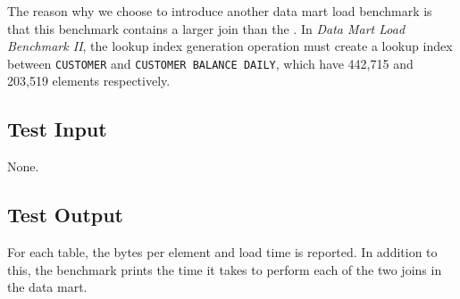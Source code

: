 The reason why we choose to introduce another data mart load benchmark is that this benchmark contains a larger join than the \tpchdl. In \textit{Data Mart Load Benchmark II}, the lookup index generation operation must create a lookup index between \texttt{CUSTOMER} and \texttt{CUSTOMER BALANCE DAILY}, which have 442,715 and 203,519 elements respectively.

\subsection{Test Input}
\label{sub:Test Input}
None.

\subsection{Test Output}
\label{sub:Test Output}
For each table, the bytes per element and load time is reported. In addition to this, the benchmark prints the time it takes to perform each of the two joins in the data mart.

%
%
%
%
%
%
%


